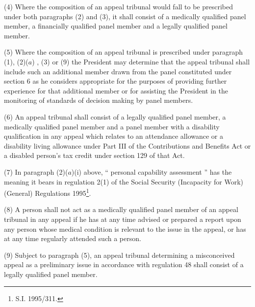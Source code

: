 \documentclass[12pt,a4paper]{article}
\begin{document}
(4) Where the composition of an appeal tribunal would fall to be prescribed under both paragraphs (2) and (3), it shall consist of a medically qualified panel member, a financially qualified panel member and a legally qualified panel member.

(5) Where the composition of an appeal tribunal is prescribed under 
paragraph (1), (2)($a$)%
    , (3) or (9)  %
the President may determine that the appeal tribunal shall include such an additional member drawn from the panel constituted under section 6 as he considers appropriate for the purposes of providing further experience for that additional member or for assisting the President in the monitoring of standards of decision making by panel members.

\enlargethispage{\baselineskip}

(6) An appeal tribunal shall consist of a legally qualified panel member, a medically qualified panel member and a panel member with a disability qualification in any appeal which relates to an attendance allowance or a disability living allowance under Part III of the Contributions and Benefits Act or 
a disabled person’s tax credit  %
under section 129 of that Act.

(7) In paragraph (2)($a$)(i) above, “%
personal capability assessment%
” has the meaning it bears in regulation 2(1) of the Social Security (Incapacity for Work) (General) Regulations 1995\footnote{\frenchspacing S.I. 1995/311.}.

(8) A person shall not act as a medically qualified panel member of an appeal tribunal in any appeal if he has at any time advised or prepared a report upon any person whose medical condition is relevant to the issue in the appeal, or has at any time regularly attended such a person.

\pagebreak[3]

(9) Subject to paragraph (5), an appeal tribunal determining a misconceived appeal as a preliminary issue in accordance with regulation 48 shall consist of a legally qualified panel member.

\end{document}
